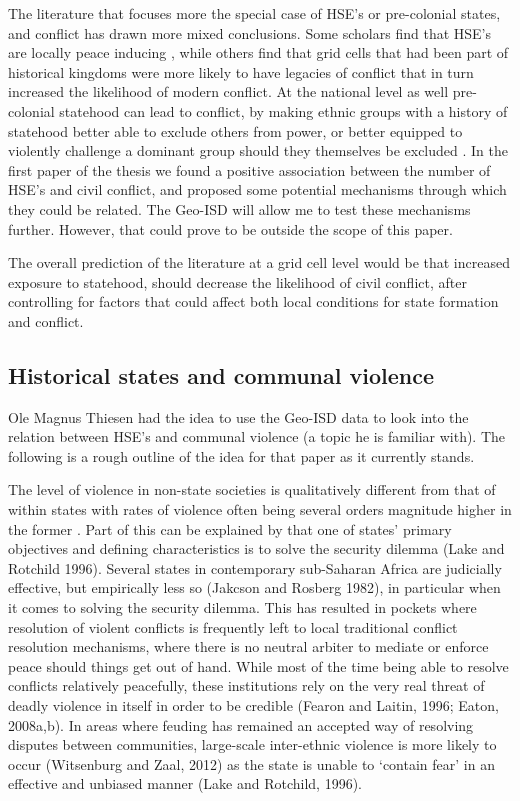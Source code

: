 \documentclass[12pt]{article}
\begin{document}
The literature that focuses more the special case of HSE's or pre-colonial
states, and conflict has drawn more mixed conclusions. Some scholars find that
HSE's are  locally peace inducing \citep{Wig2016, Depetris-Chauvin2016}, while
others find that grid cells that had been part of historical kingdoms were more
likely to have legacies of conflict that in turn increased the likelihood of
modern conflict. At the national level as well pre-colonial statehood can lead
to conflict, by making ethnic groups with a history of statehood better able to
exclude others from power, or better equipped to violently challenge a dominant
group should they themselves be excluded \citep{Paine2019}. In the first paper
of the thesis we found a positive association between the number of HSE's and
civil conflict, and proposed some potential mechanisms through which they could
be related. The Geo-ISD will allow me to test these mechanisms further. However,
that could prove to be outside the scope of this paper.

The overall prediction of the literature at a grid cell level would be that
increased exposure to statehood, should decrease the likelihood of civil
conflict, after controlling for factors that could affect both local conditions
for state formation and conflict.

\subsection{Historical states and communal violence}

Ole Magnus Thiesen had the idea to use the Geo-ISD data to look into the
relation between HSE's and communal violence (a topic he is familiar with). The
following is a rough outline of the idea for that paper as it currently stands.

The level of violence in non-state societies is qualitatively different from
that of within states with rates of violence often being several orders
magnitude higher in the former \citep{Pinker2012}. Part of this can be explained by
that one of states’ primary objectives and defining characteristics is to solve
the security dilemma (Lake and Rotchild 1996). Several states
in contemporary sub-Saharan Africa are judicially effective, but empirically
less so (Jakcson and Rosberg 1982), in particular when it comes to solving the
security dilemma. This has resulted in pockets where resolution of violent
conflicts is frequently left to local traditional conflict resolution
mechanisms, where there is no neutral arbiter to mediate or enforce peace should
things get out of hand. While most of the time being able to resolve conflicts
relatively peacefully, these institutions rely on the very real threat of deadly
violence in itself in order to be credible (Fearon and Laitin, 1996; Eaton,
2008a,b). In areas where feuding has remained an accepted way of resolving
disputes between communities, large-scale inter-ethnic violence is more likely
to occur (Witsenburg and Zaal, 2012) as the state is unable to ‘contain fear’ in
an effective and unbiased manner (Lake and Rotchild, 1996).  
\end{document}
